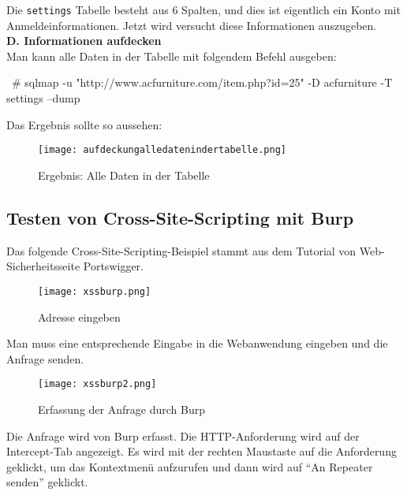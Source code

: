 Die \texttt{settings} Tabelle besteht aus 6 Spalten, und dies ist eigentlich ein Konto mit Anmeldeinformationen. Jetzt wird versucht diese Informationen auszugeben.\\

\textbf{D. Informationen aufdecken}\\

Man kann alle Daten in der Tabelle mit folgendem Befehl ausgeben:

\begin{LaTeXCode}[caption={Aufdeckung von alle Daten in der Tabelle},captionpos=b, label=LaTeXCode:alledatenausgeben1][numbers=none]
~# sqlmap -u "http://www.acfurniture.com/item.php?id=25" -D acfurniture -T settings --dump
\end{LaTeXCode}

\newpage

Das Ergebnis sollte so aussehen:

\begin{figure}[h]
	\centering
	\texttt{[image: aufdeckungalledatenindertabelle.png]}
	\caption{Ergebnis: Alle Daten in der Tabelle}
\end{figure}

\subsection{Testen von Cross-Site-Scripting mit Burp}

Das folgende Cross-Site-Scripting-Beispiel stammt aus dem Tutorial von Web-Sicherheitsseite Portswigger\cite{portswigger12}.

\begin{figure}[h]
	\centering
	\texttt{[image: xssburp.png]}
	\caption{Adresse eingeben}
\end{figure}

Man muss eine entsprechende Eingabe in die Webanwendung eingeben und die Anfrage senden.

\begin{figure}[h]
	\centering
	\texttt{[image: xssburp2.png]}
	\caption{Erfassung der Anfrage durch Burp}
\end{figure}

\newpage

Die Anfrage wird von Burp erfasst. Die HTTP-Anforderung wird auf der Intercept-Tab angezeigt. Es wird mit der rechten Maustaste auf die Anforderung geklickt, um das Kontextmenü aufzurufen und dann wird auf "`An Repeater senden"' geklickt.

